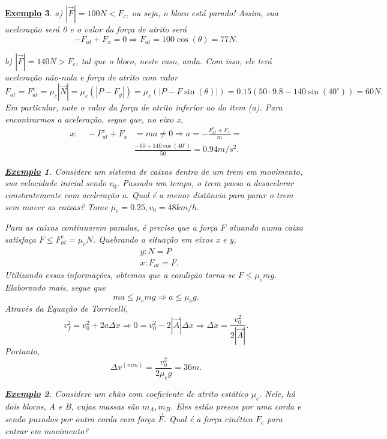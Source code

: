 \documentclass{article}
\newtheorem{example}{\underline{Exemplo}}
\begin{document}
\begin{example}
  a) $|\vec{F}|= 100N < F_{c}$, ou seja, o bloco está parado! Assim, sua aceleração será 0 e o valor da força de atrito será
    $$
      -F_{at} + F_{x} = 0 \Rightarrow  F_{at} = 100\cos{(\theta )} = 77N.
    $$

  b) $|\vec{F}| = 140N > F_{c}$, tal que o bloco, neste caso, anda. Com isso, ele terá aceleração não-nula e força de atrito com valor 
    $$
      F_{at} = F_{at}^{c} = \mu_{c}|\vec{N}| = \mu_{c}(|P-F_{y}|) = \mu_{c}(|P-F\sin{(\theta )}|) = 0.15(50 \cdot 9.8 - 140\sin{(40^{\circ})}) = 60N.
    $$
    Em particular, note o valor da força de atrito inferior ao do item (a). Para encontrarmos a aceleração, segue que, no eixo x,
   \begin{align*}
     x:\quad -F_{at}^{c} + F_{x} &= ma\neq0 \Rightarrow a = -\frac{F_{at}^{c}+F_{x}}{m} =\\
                                 &\frac{-60+140\cos{(40^{\circ})}}{50} = 0.94m/s^{2}.
   \end{align*}

  \begin{example}
    Considere um sistema de caixas dentro de um trem em movimento, sua velocidade inicial sendo $v_{0}$. Passado um tempo,
    o trem passa a desacelerar constantemente com aceleração a. Qual é a menor distância para parar o trem sem mover as caixas? Tome
    $\mu_{e}=0.25, v_{0}=48km/h.$

    Para as caixas continuarem paradas, é preciso que a força $F$ atuando numa caixa satisfaça $F\leq F_{at}^{e} = \mu_{e}N$.
    Quebrando a situação em eixos x e y, 
   \begin{align*}
     &y: N = P \\
     &x: F_{at} = F.
   \end{align*}
   Utilizando essas informações, obtemos que a condição torna-se $F\leq \mu_{e}mg.$ Elaborando mais, segue que 
     $$
       ma\leq \mu_{e}mg \Rightarrow  a\leq \mu_{e}g.
     $$
    Através da Equação de Torricelli, 
      $$
        v_{f}^{2} = v_{0}^{2} + 2a\Delta x \Rightarrow 0 = v_{0}^{2} - 2|\vec{A}|\Delta x \Rightarrow \Delta x = \frac{v_{0}^{2}}{2|\vec{A}|}.
      $$
      Portanto, 
        $$
          \Delta x^{(min)} = \frac{v_{0}^{2}}{2\mu_{e}g} = 36m.
        $$
  \end{example}
  \begin{example}
    Considere um chão com coeficiente de atrito estático $\mu_{e}.$ Nele, há dois blocos, A e B, cujas massas são
    $m_{A}, m_{B}$. Eles estão presos por uma corda e sendo puxados por outra corda com força $\vec{F}.$ Qual é a força 
    cinética $F_{c}$ para entrar em movimento?
   \begin{center}
     \begin{tikzpicture}[scale=1, transform shape]


\end{tikzpicture}
\end{center}
\end{example}
\end{example}
\end{document}
